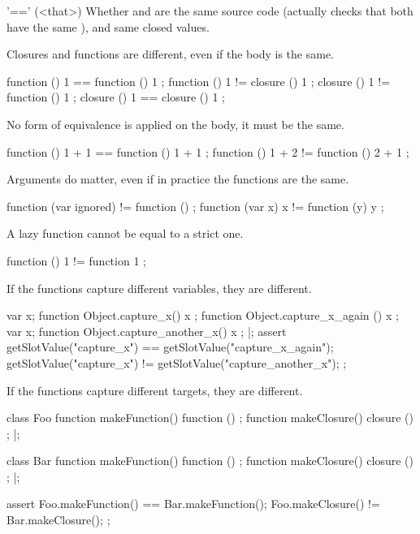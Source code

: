 \begin{urbiscriptapi}
\item['=='](<that>)%
  Whether \this and  are the same source code (actually checks
  that both have the same ), and same closed values.

  Closures and functions are different, even if the body is the same.
\begin{urbiassert}
function () { 1 } == function () { 1 };
function () { 1 } != closure  () { 1 };
closure  () { 1 } != function () { 1 };
closure  () { 1 } == closure  () { 1 };
\end{urbiassert}

No form of equivalence is applied on the body, it must be the same.
\begin{urbiassert}
function () { 1 + 1 } == function () { 1 + 1 };
function () { 1 + 2 } != function () { 2 + 1 };
\end{urbiassert}

Arguments do matter, even if in practice the functions are the same.
\begin{urbiassert}
function (var ignored) {} != function () {};
function (var x) { x }    != function (y) { y };
\end{urbiassert}

A lazy function cannot be equal to a strict one.
\begin{urbiassert}
function () { 1 } != function { 1 };
\end{urbiassert}

If the functions capture different variables, they are different.
\begin{urbiscript}
{
  var x;
  function Object.capture_x() { x };
  function Object.capture_x_again () { x };
  {
    var x;
    function Object.capture_another_x() { x };
  }
}|;
assert
{
  getSlotValue("capture_x") == getSlotValue("capture_x_again");
  getSlotValue("capture_x") != getSlotValue("capture_another_x");
};
\end{urbiscript}

If the functions capture different targets, they are different.
\begin{urbiscript}
class Foo
{
  function makeFunction() { function () {} };
  function makeClosure()  { closure () {} };
}|;

class Bar
{
  function makeFunction() { function () {} };
  function makeClosure()  { closure () {} };
}|;

assert
{
  Foo.makeFunction() == Bar.makeFunction();
  Foo.makeClosure()  != Bar.makeClosure();
};
\end{urbiscript}



\end{urbiscriptapi}
